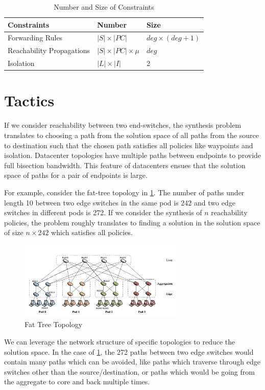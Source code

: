 \documentclass[]{sig}
\begin{document}
\begin{table}[H]
\begin{center}
	\begin{tabular}{||m{6em} | m{7em} | m{7em} ||} 
		\hline
		Constraints & Number & Size \\ [0.5ex] 
		\hline\hline
		Forwarding Rules & $|S| \times |PC| $ & $deg \times (deg + 1)$ \\ [0.5ex] 
		\hline
		Reachability Propagations & $|S| \times |PC| \times \mu $ & $deg$ \\ [0.5ex] 
		\hline
		Isolation & $|L| \times |I|$ & 2 \\
		\hline
	\end{tabular}
\end{center}
\caption{Number and Size of Constraints} \label{tab:title} 
\end{table}

\section{Tactics} \label{sec:tactic}
If we consider reachability between two end-switches, the synthesis problem translates to choosing a path from the solution space of all paths from the source to destination such that the chosen path satisfies all policies like waypoints and isolation. Datacenter topologies have multiple paths between endpoints to provide full bisection bandwidth. This feature of datacenters ensues that the solution space of paths for a pair of endpoints is large. 

For example, consider the fat-tree topology in \cref{fattree}. The number of paths under length 10 between two edge  switches in the same pod is 242 and two edge switches in different pods is 272. If we consider the synthesis of $n$ reachability policies, the problem roughly translates to finding a solution in the solution space of size $n \times 242$ which satisfies all policies. 
\begin{figure}[H]
	\includegraphics[width=8cm]{fattree.png}
	\caption{Fat Tree Topology}
	\label{fattree}
\end{figure}
We can leverage the network structure of specific topologies to reduce the solution space. In the case of \cref{fattree}, the 272 paths between two edge switches would contain many paths which can be avoided, like paths which traverse through edge switches other than the source/destination, or paths which would be  going from the aggregate to core and back multiple times. 
\end{document}
